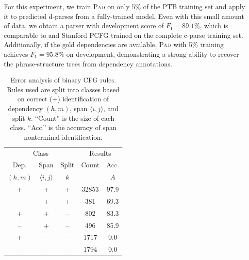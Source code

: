 \documentclass[11pt,letterpaper]{article}
\newcommand{\Span}[1]{\langle #1 \rangle}
\newcommand{\ParseName}{\textsc{Pad}\xspace}
\begin{document}
For this experiment, we train \ParseName on only 5\% of the PTB training set and apply it to predicted d-parses from a fully-trained model. Even with this small amount of 
data, we obtain a parser with development score of  $F_1 = 89.1\%$, which is comparable to  and Stanford PCFG \cite{klein2003accurate} trained on the complete c-parse training set. Additionally, if the gold dependencies are available, \ParseName{} with 5\% training achieves $F_1 = 95.8\%$ on development, demonstrating a strong ability to recover the phrase-structure trees from dependency annotations.










\begin{table}
  \centering
  \footnotesize
  \begin{tabular}{ccccc}
    \toprule
    \multicolumn{3}{c}{Class} & \multicolumn{2}{c}{Results} \\
    Dep. & Span & Split & Count & Acc.  \\ 
    $(h, m)$ & $\Span{i,j}$ & $k$ &  & $A$ \\ 
    \midrule
    + & + & +  &  32853 &  97.9   \\ 
    -- & + & +  &  381 & 69.3   \\ 
    + & + & --  &  802   & 83.3   \\ 
    -- & + & --  &  496 & 85.9   \\ 
    + & -- & --  &  1717 & 0.0    \\ 
    -- & -- & --  &  1794 & 0.0    \\ 
    \bottomrule
  \end{tabular}
  \caption{Error analysis of binary CFG rules. Rules used are split into classes based on 
    correct (+) identification of dependency $(h,m)$, span $\Span{i,j}$, and split $k$. 
    ``Count'' is the size of each class. ``Acc.'' is the accuracy of span nonterminal identification. \label{tab:analysis}}
\end{table}
\end{document}
